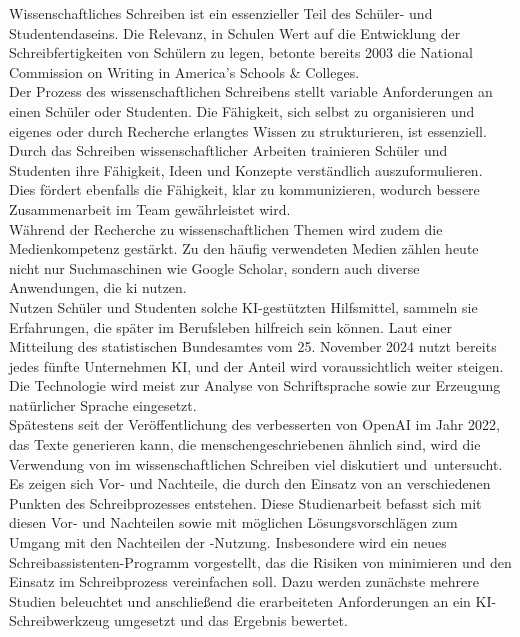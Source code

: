 \documentclass[../main.tex]{subfiles}
\begin{document}
Wissenschaftliches Schreiben ist ein essenzieller Teil des Schüler- und Studentendaseins. Die Relevanz, in Schulen Wert auf die Entwicklung der Schreibfertigkeiten von Schülern zu legen, 
betonte bereits 2003 die National Commission on Writing in America’s Schools \& Colleges\cite{nationalcommissionwriting}. \\ Der Prozess des wissenschaftlichen Schreibens stellt variable 
Anforderungen an einen Schüler oder Studenten. Die Fähigkeit, sich selbst zu organisieren und eigenes oder durch Recherche erlangtes Wissen zu strukturieren, ist essenziell. Durch das 
Schreiben wissenschaftlicher Arbeiten trainieren Schüler und Studenten ihre Fähigkeit, Ideen und Konzepte verständlich auszuformulieren. Dies fördert ebenfalls die Fähigkeit, klar zu 
kommunizieren, wodurch bessere Zusammenarbeit im Team gewährleistet wird.\cite{nationalcommissionwriting,teachers,humanWritingToAi} \\ 
Während der Recherche zu wissenschaftlichen Themen wird zudem die Medienkompetenz gestärkt. Zu den häufig verwendeten Medien zählen heute nicht nur Suchmaschinen wie Google Scholar, sondern 
auch diverse Anwendungen, die \gls{ki} nutzen.\\ Nutzen Schüler und Studenten solche KI-gestützten Hilfsmittel, sammeln sie Erfahrungen, die später im Berufsleben hilfreich sein können. Laut 
einer Mitteilung des statistischen Bundesamtes vom 25. November 2024 nutzt bereits jedes fünfte Unternehmen KI, und der Anteil wird voraussichtlich weiter steigen\cite{statistischesBundesamt}. 
Die Technologie wird meist zur Analyse von Schriftsprache sowie zur Erzeugung natürlicher Sprache eingesetzt\cite{statistischesBundesamt}.\\ 
Spätestens seit der Veröffentlichung des verbesserten  von OpenAI im Jahr 2022, das Texte generieren kann, die menschengeschriebenen ähnlich sind, wird die Verwendung von 
 im wissenschaftlichen Schreiben viel diskutiert \mbox{und untersucht.\cite{humanWritingToAi,ZukunftWissenschaftlichesPublizieren}}\\
Es zeigen sich Vor- und Nachteile, die durch den Einsatz von  an verschiedenen Punkten des Schreibprozesses entstehen. Diese Studienarbeit befasst sich mit diesen 
Vor- und Nachteilen sowie mit möglichen Lösungsvorschlägen zum Umgang mit den Nachteilen der -Nutzung. Insbesondere wird ein neues Schreibassistenten-Programm vorgestellt, das 
die Risiken von  minimieren und den Einsatz im Schreibprozess vereinfachen soll. Dazu werden zunächste mehrere Studien beleuchtet und anschließend die erarbeiteten Anforderungen an ein KI-Schreibwerkzeug
umgesetzt und das Ergebnis bewertet.
\end{document}
